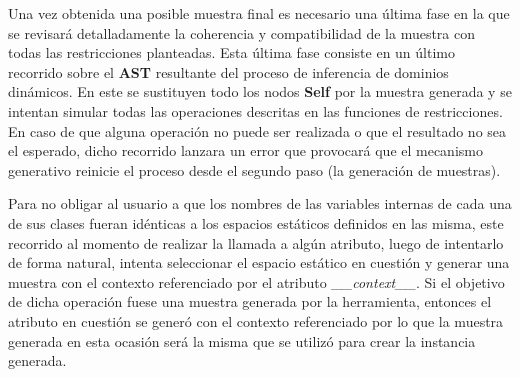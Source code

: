 Una vez obtenida una posible muestra final es necesario una última fase en la que se
revisará detalladamente la coherencia y compatibilidad de la muestra con todas las restricciones planteadas. Esta última fase consiste
en un último recorrido sobre el {\bf AST} resultante del proceso de inferencia de dominios dinámicos. En este se sustituyen todo los nodos
    {\bf Self} por la muestra generada y se intentan simular todas las operaciones descritas en las funciones de restricciones. En caso de que
alguna operación no puede ser realizada o que el resultado no sea el esperado, dicho recorrido lanzara un error que provocará que el
mecanismo generativo reinicie el proceso desde el segundo paso (la generación de muestras).

Para no obligar al usuario a que los nombres de las variables internas de cada una de sus clases fueran idénticas a los espacios
estáticos definidos en las misma, este recorrido al momento de realizar la llamada a algún atributo, luego de intentarlo de forma
natural, intenta seleccionar el espacio estático en cuestión y generar una muestra con el contexto referenciado por el atributo
    {\it \_\_context\_\_}. Si el objetivo de dicha operación fuese una muestra generada por la herramienta, entonces el atributo en cuestión se
generó con el contexto referenciado por lo que la muestra generada en esta ocasión será la misma que se utilizó para crear la instancia
generada.
